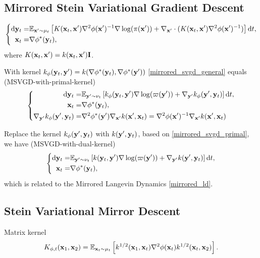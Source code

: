\subsection{Mirrored Stein Variational Gradient Descent}
\begin{align}\label{mirrored_svgd_general}
	\left\{
		\begin{aligned}
			\mathrm{d} \mathbf{y}_t = &  \mathbb{E}_{\mathbf{x}'\sim\mu_t}\left[K(\mathbf{x}_t,\mathbf{x}')\nabla^2\phi(\mathbf{x}')^{-1}\nabla\log(\pi(\mathbf{x}'))+\nabla_{\mathbf{x}'}\cdot(K(\mathbf{x}_t,\mathbf{x}')\nabla^2\phi(\mathbf{x}')^{-1})\right]  \mathrm{d} t, \\ 
			\mathbf{x}_t = & \nabla\phi^*(\mathbf{y}_t),
		\end{aligned}
	\right.
\end{align}
where $K(\mathbf{x}_t,\mathbf{x}') = k(\mathbf{x}_t, \mathbf{x}')\mathbf{I}$. 

With kernel $k_\phi(\mathbf{y}_t, \mathbf{y}') = k(\nabla\phi^*(\mathbf{y}_t), \nabla\phi^*(\mathbf{y}'))$ \eqref{mirrored_svgd_general} equals (MSVGD-with-primal-kernel) 
\begin{align}\label{mirrored_svgd_primal}
	\left\{
		\begin{aligned}
			\mathrm{d} \mathbf{y}_t = &  \mathbb{E}_{\mathbf{y}'\sim\nu_t}\left[k_\phi(\mathbf{y}_t,\mathbf{y}')\nabla\log(\varpi(\mathbf{y}'))+\nabla_{\mathbf{y}'}k_\phi(\mathbf{y}',\mathbf{y}_t)\right]  \mathrm{d} t, \\ 
			\mathbf{x}_t = & \nabla\phi^*(\mathbf{y}_t),\\
			\nabla_{\mathbf{y}'}k_\phi(\mathbf{y}',\mathbf{y}_t) = &\nabla^2\phi^*(\mathbf{y}')\nabla_{\mathbf{x}'}k(\mathbf{x}',\mathbf{x}_t) = \nabla^2\phi(\mathbf{x}')^{-1}\nabla_{\mathbf{x}'}k(\mathbf{x}',\mathbf{x}_t)
		\end{aligned}
	\right.
\end{align}

Replace the kernel $k_\phi(\mathbf{y}', \mathbf{y}_t)$ with $k(\mathbf{y}', \mathbf{y}_t)$, based on \eqref{mirrored_svgd_primal}, we have (MSVGD-with-dual-kernel)
\begin{align}\label{mirrored_svgd_dual}
	\left\{
		\begin{aligned}
			\mathrm{d} \mathbf{y}_t = &  \mathbb{E}_{\mathbf{y}'\sim\nu_t}\left[k(\mathbf{y}_t,\mathbf{y}')\nabla\log(\varpi(\mathbf{y}'))+\nabla_{\mathbf{y}'}k(\mathbf{y}',\mathbf{y}_t)\right]  \mathrm{d} t, \\ 
			\mathbf{x}_t = & \nabla\phi^*(\mathbf{y}_t), 
		\end{aligned}
	\right.
\end{align}
which is related to the Mirrored Langevin Dynamics \eqref{mirrored_ld}.

\subsection{Stein Variational Mirror Descent}
Matrix kernel
\begin{align}
	K_{\phi,t}(\mathbf{x}_1, \mathbf{x}_2) = \mathbb{E}_{\mathbf{x}_t\sim\mu_t}\left[k^{1/2}(\mathbf{x}_1,\mathbf{x}_t)\nabla^2\phi(\mathbf{x}_t)k^{1/2}(\mathbf{x}_t,\mathbf{x}_2)\right].
\end{align}